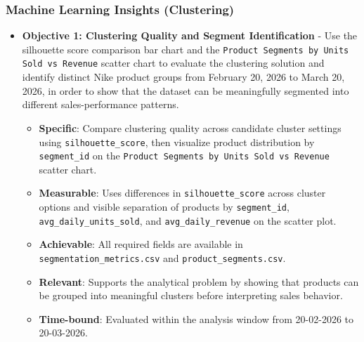     \subsubsection{Machine Learning Insights (Clustering)}
    \begin{itemize}
        \item \textbf{Objective 1: Clustering Quality and Segment Identification} - Use the silhouette score comparison bar chart and the \texttt{Product Segments by Units Sold vs Revenue} scatter chart to evaluate the clustering solution and identify distinct Nike product groups from February 20, 2026 to March 20, 2026, in order to show that the dataset can be meaningfully segmented into different sales-performance patterns.
        \begin{itemize}
            \item \textbf{Specific}: Compare clustering quality across candidate cluster settings using \texttt{silhouette\_score}, then visualize product distribution by \texttt{segment\_id} on the \texttt{Product Segments by Units Sold vs Revenue} scatter chart.
            \item \textbf{Measurable}: Uses differences in \texttt{silhouette\_score} across cluster options and visible separation of products by \texttt{segment\_id}, \texttt{avg\_daily\_units\_sold}, and \texttt{avg\_daily\_revenue} on the scatter plot.
            \item \textbf{Achievable}: All required fields are available in \texttt{segmentation\_metrics.csv} and \texttt{product\_segments.csv}.
            \item \textbf{Relevant}: Supports the analytical problem by showing that products can be grouped into meaningful clusters before interpreting sales behavior.
            \item \textbf{Time-bound}: Evaluated within the analysis window from 20-02-2026 to 20-03-2026.
        \end{itemize}
    \end{itemize}

